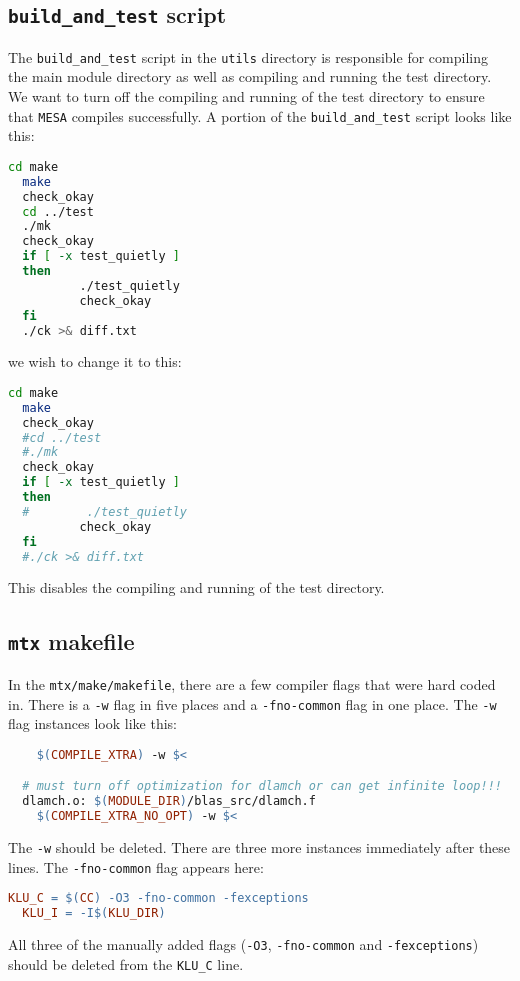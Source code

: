 \subsection{{\tt build\_and\_test} script}

The {\tt build\_and\_test} script in the {\tt utils} directory is 
responsible for compiling the main module directory as well as compiling 
and running the test directory. We want to turn off the compiling and 
running of the test directory to ensure that {\tt MESA} compiles successfully. 
A portion of the {\tt build\_and\_test} script looks like this:
\begin{lstlisting}[language=bash,mathescape=false]
  cd make
  make
  check_okay
  cd ../test
  ./mk
  check_okay
  if [ -x test_quietly ]
  then
          ./test_quietly
          check_okay
  fi
  ./ck >& diff.txt
\end{lstlisting}
we wish to change it to this:
\begin{lstlisting}[language=bash,mathescape=false]
  cd make
  make
  check_okay
  #cd ../test
  #./mk
  check_okay
  if [ -x test_quietly ]
  then
  #        ./test_quietly
          check_okay
  fi
  #./ck >& diff.txt
\end{lstlisting}
This disables the compiling and running of the test directory.

\subsection{{\tt mtx} makefile}

In the {\tt mtx/make/makefile}, there are a few compiler flags that were hard 
coded in. There is a {\tt -w} flag in five places and a {\tt -fno-common} 
flag in one place. The {\tt -w} flag instances look like this:
\begin{lstlisting}[language=make,mathescape=false]
  %.o: $(MODULE_DIR)/lapack_src/%.f
  	$(COMPILE_XTRA) -w $<

  # must turn off optimization for dlamch or can get infinite loop!!!
  dlamch.o: $(MODULE_DIR)/blas_src/dlamch.f
  	$(COMPILE_XTRA_NO_OPT) -w $<
\end{lstlisting}
The {\tt -w} should be deleted. There are three more instances immediately 
after these lines. The {\tt -fno-common} flag appears here:
\begin{lstlisting}[language=make,mathescape=false]
  KLU_C = $(CC) -O3 -fno-common -fexceptions
  KLU_I = -I$(KLU_DIR)
\end{lstlisting}
All three of the manually added flags ({\tt -O3}, {\tt -fno-common} and 
{\tt -fexceptions}) should be deleted from the {\tt KLU\_C} line.

